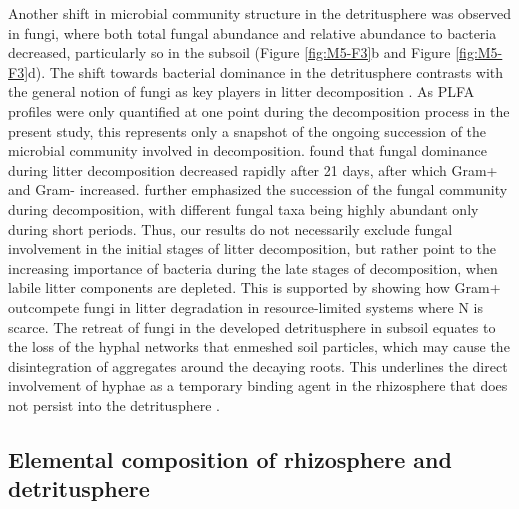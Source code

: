 Another shift in microbial community structure in the detritusphere was observed in fungi, where both total fungal abundance and relative abundance to bacteria decreased, particularly so in the subsoil (Figure \ref{fig:M5-F3}b and Figure \ref{fig:M5-F3}d). The shift towards bacterial dominance in the detritusphere contrasts with the general notion of fungi as key players in litter decomposition \citep{Williams2006, Voriskova2013}. As PLFA profiles were only quantified at one point during the decomposition process in the present study, this represents only a snapshot of the ongoing succession of the microbial community involved in decomposition. \citet{Herman2012} found that fungal dominance during litter decomposition decreased rapidly after 21 days, after which Gram+ and Gram- increased. \citet{Voriskova2013} further emphasized the succession of the fungal community during decomposition, with different fungal taxa being highly abundant only during short periods. Thus, our results do not necessarily exclude fungal involvement in the initial stages of litter decomposition, but rather point to the increasing importance of bacteria during the late stages of decomposition, when labile litter components are depleted. This is supported by \citet{Esperschuetz2011} showing how Gram+ outcompete fungi in litter degradation in resource-limited systems where N is scarce. The retreat of fungi in the developed detritusphere in subsoil equates to the loss of the hyphal networks that enmeshed soil particles, which may cause the disintegration of aggregates around the decaying roots. This underlines the direct involvement of hyphae as a temporary binding agent in the rhizosphere that does not persist into the detritusphere \citep{Six2004}.

\subsection{Elemental composition of rhizosphere and detritusphere}

